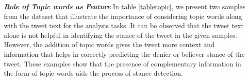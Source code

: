 \documentclass[letterpaper]{article}
\begin{document}
\begin{table}
\centering
{}
\caption{Examples with stance, tweet text and topic words}
\label{tabletopic}
\end{table}
\par \noindent \textit{\textbf{{Role of Topic words as Feature}}} In table \ref{tabletopic}, we present two samples from the dataset that illustrate the importance of considering topic words along with the tweet text for the analysis tasks. It can be observed that the tweet text alone is not helpful in identifying the stance of the tweet in the given samples. However, the addition of topic words gives the tweet more context and information that helps in correctly predicting the denier or believer stance of the tweet. These examples show that the presence of complementary information in the form of topic words aids the process of stance detection.

\end{document}
